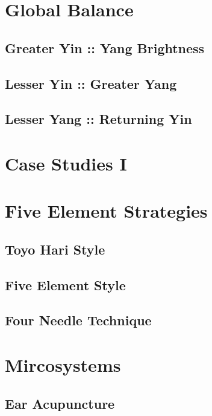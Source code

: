 \documentclass{beamer}
\begin{document}
\section{Global Balance}

\subsection{Greater Yin :: Yang Brightness}

\subsection{Lesser Yin :: Greater Yang}

\subsection{Lesser Yang :: Returning Yin}

\section{Case Studies I}

\section{Five Element Strategies}

\subsection{Toyo Hari Style}

\subsection{Five Element Style}

\subsection{Four Needle Technique}

\section{Mircosystems}

\subsection{Ear Acupuncture}
\end{document}
